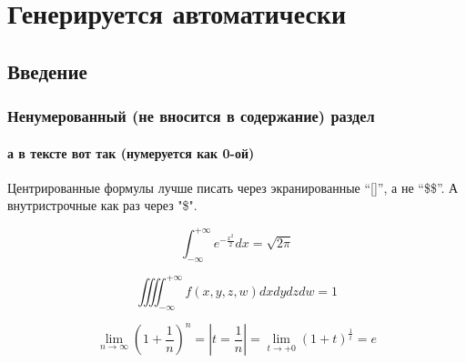




\tableofcontents %
\listoffigures %
\listoftables %

\part{Генерируется автоматически}
\chapter{Введение}
\section*{Ненумерованный (не вносится в содержание) раздел}
\subsection[В содержании именуется вот так]{а в тексте вот так (нумеруется как
0-ой)}




Центрированные формулы лучше писать через экранированные ``[]'', а не ``\$\$''.
А внутристрочные как раз через "\$".

\[
  \int_{- \infty}^{+ \infty} e^{- \frac{x^2}{2}} dx = \sqrt{2 \pi}
\]

\[ \iiiint_{-\infty}^{+\infty} f(x, y, z, w)dxdydzdw = 1 \]

\[ \lim_{n \to \infty} \left( 1 + \frac{1}{n} \right)^n = |t = \frac{1}{n}| = \lim_{t \to +0} \left( 1 + t \right)^\frac{1}{t} = e \]


